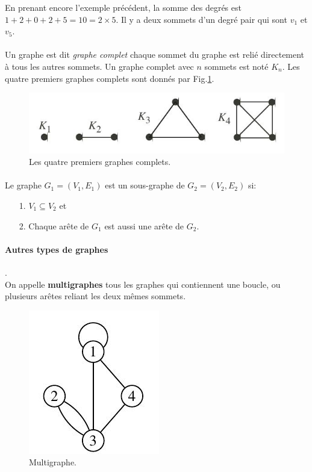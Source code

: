 En prenant encore l'exemple précédent, la somme des degrés est $ 1+2+0+2+5 = 10 = 2\times 5$.
Il y a deux sommets d'un degré pair qui sont $v_{1}$ et $v_{5}$.

\paragraph*{}
Un graphe est dit \textit{graphe complet} chaque sommet du graphe est relié directement à tous les autres
sommets.
Un graphe complet avec $n$ sommets est noté $K_{n}$. Les quatre premiers graphes complets sont donnés
par Fig.\ref{fig:graph2}. 

\begin{figure}[h]
\centering
\includegraphics[width=0.5\linewidth]{images/graph2}
\caption[Les quatre premiers graphes complets.]{Les quatre premiers graphes complets.}
\label{fig:graph2}
\end{figure}
\paragraph*{}
\noindent Le graphe $G_{1} = (V_{1},E_{1})$ est un sous-graphe de $G_{2}=(V_{2},E_{2})$ si:
\begin{itemize}
	\item[1.] $V_{1}\subseteq V_{2}$ et
	\item[2.] Chaque arête de $G_{1}$ est aussi une arête de $G_{2}$.
\end{itemize}

\paragraph*{Autres types de graphes}.\\
On appelle \textbf{multigraphes} tous les graphes qui contiennent une boucle, ou
plusieurs arêtes reliant les deux mêmes sommets.

\begin{figure}[h]
\centering
\includegraphics[width=0.2\linewidth]{images/graph3}
\caption[Multigraphe.]{Multigraphe.}
\label{fig:graph3}
\end{figure}

